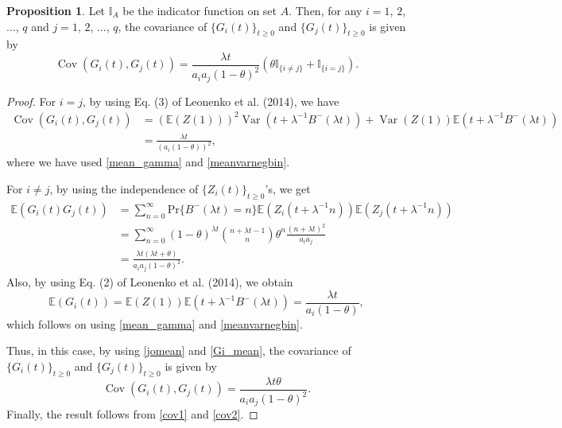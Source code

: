\documentclass[12pt,oneside,reqno]{amsart}
\numberwithin{equation}{section}
\theoremstyle{definition}
\numberwithin{equation}{section}
\newtheorem{proposition}{Proposition}[section]
\theoremstyle{remarkstyle}
\begin{document}
\begin{proposition}
Let $\mathbb{I}_{A}$ be the indicator function on set $A$. Then, for any $i=1$, $2$, $\dots$, $q$ and $j=1$, $2$, $\dots$, $q$, the covariance of $\{G_i(t)\}_{t\ge 0}$ and $\{G_j(t)\}_{t\ge 0}$ is given by
\begin{equation*}
\operatorname{Cov}(G_i(t),G_j(t))=\frac{\lambda t}{a_ia_j(1-\theta)^2}(\theta \mathbb{I}_{\{i\ne j\}}+\mathbb{I}_{\{i=j\}}).
\end{equation*}
\end{proposition}
\begin{proof}
For $i=j$, by using Eq. (3) of Leonenko et al. (2014), we have
\begin{align}\label{cov1}
\operatorname{Cov}(G_i(t),G_j(t))&=(\mathbb{E}(Z(1)))^2\operatorname{Var}(t+\lambda^{-1}B^-(\lambda t))+\operatorname{Var}(Z(1))\mathbb{E}(t+\lambda^{-1}B^-(\lambda t))\nonumber\\
&=\frac{\lambda t}{(a_i(1-\theta))^2},
\end{align}
where we have used \eqref{mean_gamma} and \eqref{meanvarnegbin}.

For $i\ne j$, by using the independence of $\{Z_i(t)\}_{t\ge0}$'s, we get
 \begin{align}\label{jomean}
\mathbb{E}(G_i(t)G_j(t))&=\sum_{n=0}^{\infty}\mathrm{Pr}\{B^-(\lambda t)=n\} \mathbb{E}(Z_i(t+\lambda^{-1}n))\mathbb{E}(Z_j(t+\lambda^{-1}n))\nonumber\\
&=\sum_{n=0}^{\infty}(1-\theta)^{\lambda t}{n+\lambda t-1 \choose n}\theta^n \frac{(n+\lambda t)^2}{a_ia_j}\nonumber\\
&=\frac{\lambda t (\lambda t+\theta)}{a_ia_j(1-\theta)^2}.
\end{align}
Also, by using Eq. (2) of Leonenko et al. (2014), we obtain
\begin{equation}\label{Gi_mean}
\mathbb{E}(G_i(t))= \mathbb{E}(Z(1))\mathbb{E}(t+\lambda^{-1}B^-(\lambda t))=\frac{\lambda t}{a_i(1-\theta)},
\end{equation}
which follows on using \eqref{mean_gamma} and \eqref{meanvarnegbin}.

Thus, in this case, by using \eqref{jomean} and \eqref{Gi_mean}, the covariance of $\{G_i(t)\}_{t\ge 0}$ and $\{G_j(t)\}_{t\ge 0}$ is given by
\begin{equation}\label{cov2}
\operatorname{Cov}(G_i(t),G_j(t))=\frac{\lambda t\theta}{a_ia_j(1-\theta)^2}.
\end{equation}
Finally, the result follows from \eqref{cov1} and \eqref{cov2}.
\end{proof}
\end{document}
